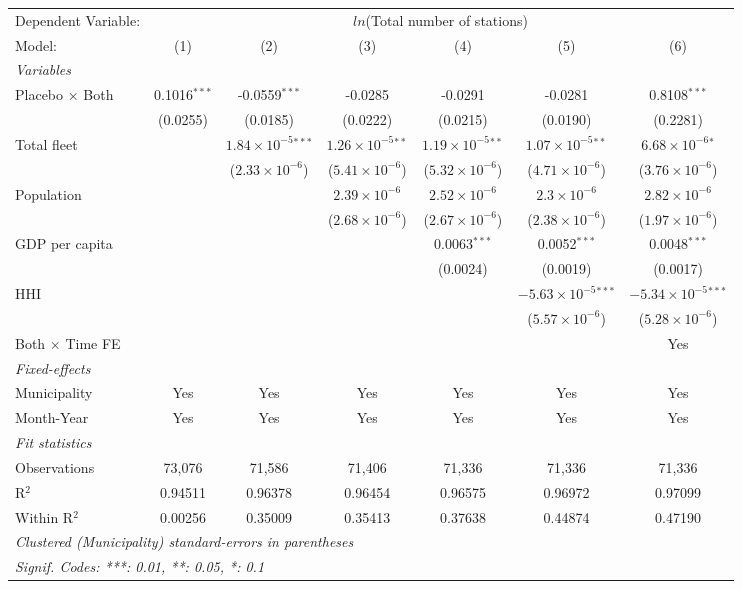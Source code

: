 \documentclass[
]{article}
\begin{document}
\begin{tabular}{lcccccc}
\tabularnewline\midrule\midrule
Dependent Variable:&\multicolumn{6}{c}{$ln$(Total number of stations)}\\
Model:&(1) & (2) & (3) & (4) & (5) & (6)\\
\midrule \emph{Variables}&   &   &   &   &   &  \\
Placebo $\times $ Both & 0.1016$^{***}$ & -0.0559$^{***}$ & -0.0285 & -0.0291 & -0.0281 & 0.8108$^{***}$\\
  &(0.0255) & (0.0185) & (0.0222) & (0.0215) & (0.0190) & (0.2281)\\
Total fleet &    & $1.84\times 10^{-5}$$^{***}$ & $1.26\times 10^{-5}$$^{**}$ & $1.19\times 10^{-5}$$^{**}$ & $1.07\times 10^{-5}$$^{**}$ & $6.68\times 10^{-6}$$^{*}$\\
  &   & ($2.33\times 10^{-6}$) & ($5.41\times 10^{-6}$) & ($5.32\times 10^{-6}$) & ($4.71\times 10^{-6}$) & ($3.76\times 10^{-6}$)\\
Population &    &    & $2.39\times 10^{-6}$ & $2.52\times 10^{-6}$ & $2.3\times 10^{-6}$ & $2.82\times 10^{-6}$\\
  &   &    & ($2.68\times 10^{-6}$) & ($2.67\times 10^{-6}$) & ($2.38\times 10^{-6}$) & ($1.97\times 10^{-6}$)\\
GDP per capita &    &    &    & 0.0063$^{***}$ & 0.0052$^{***}$ & 0.0048$^{***}$\\
  &   &    &    & (0.0024) & (0.0019) & (0.0017)\\
HHI &    &    &    &    & $-5.63\times 10^{-5}$$^{***}$ & $-5.34\times 10^{-5}$$^{***}$\\
  &   &    &    &    & ($5.57\times 10^{-6}$) & ($5.28\times 10^{-6}$)\\
Both $\times$ Time FE &  &  &  &  &  & Yes\\
\midrule \emph{Fixed-effects}&   &   &   &   &   &  \\
Municipality & Yes & Yes & Yes & Yes & Yes & Yes\\
Month-Year & Yes & Yes & Yes & Yes & Yes & Yes\\
\midrule \emph{Fit statistics}&  & & & & & \\
Observations & 73,076&71,586&71,406&71,336&71,336&71,336\\
R$^2$ & 0.94511&0.96378&0.96454&0.96575&0.96972&0.97099\\
Within R$^2$ & 0.00256&0.35009&0.35413&0.37638&0.44874&0.47190\\
\midrule\midrule\multicolumn{7}{l}{\emph{Clustered (Municipality) standard-errors in parentheses}}\\
\multicolumn{7}{l}{\emph{Signif. Codes: ***: 0.01, **: 0.05, *: 0.1}}\\
\end{tabular}
\end{document}
